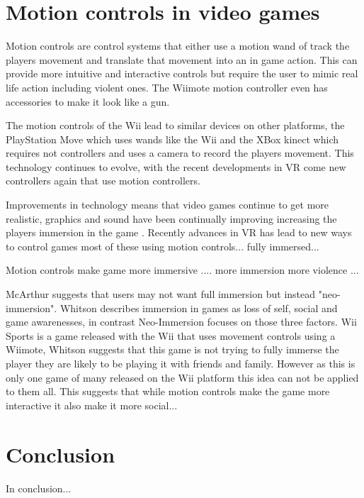 \documentclass{scrartcl}
\begin{document}
\section{Motion controls in video games}
Motion controls are control systems that either use a motion wand of track the players movement and translate that movement into an in game action. This can provide more intuitive and interactive controls but require the user to mimic real life action including violent ones. \cite{Kim} The Wiimote motion controller even has accessories to make it look like a gun.

The motion controls of the Wii lead to similar devices on other platforms, the PlayStation Move which uses wands 
like the Wii and the XBox kinect which requires not controllers and uses a camera to record the players movement.
This technology continues to evolve, with the recent developments in VR come new controllers again that use motion controllers. 

Improvements in technology means that video games continue to get more realistic, graphics and sound have been continually improving increasing the players immersion in the game \cite{Kim}. Recently advances in VR has lead to new ways to control games most of these using motion controls... fully immersed...
 
Motion controls make game more immersive .... more immersion more violence ...


McArthur suggests that users may not want full immersion but instead "neo-immersion". \cite{McArthur} Whitson describes immersion in games as loss of  self, social and game awarenesses, in contrast Neo-Immersion focuses on those three factors. \cite{Whitson} Wii Sports is a game released with the Wii that uses movement controls using a Wiimote, Whitson suggests that this game is not trying to fully immerse the player they are likely to be playing it with friends and family. However as this is only one game of many released on the Wii platform this idea can not be applied to them all. 
This suggests that while motion controls make the game more interactive it also make it more social...




\section{Conclusion}
In conclusion...

	


	
\end{document}
